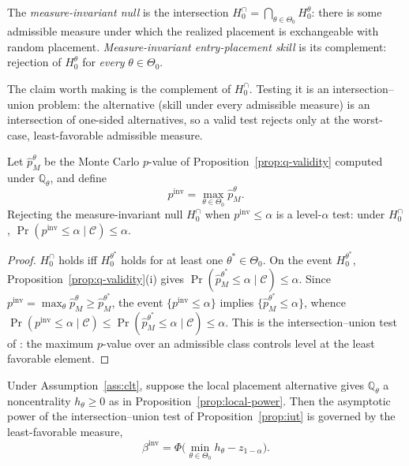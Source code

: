 \begin{definition}
\label{def:invariant}
The \emph{measure-invariant null} is the intersection
$H_0^{\cap}=\bigcap_{\theta\in\Theta_0}H_0^\theta$: there is some admissible
measure under which the realized placement is exchangeable with random placement.
\emph{Measure-invariant entry-placement skill} is its complement: rejection of
$H_0^\theta$ for \emph{every} $\theta\in\Theta_0$.
\end{definition}

The claim worth making is the complement of $H_0^{\cap}$. Testing it is an
intersection--union problem: the alternative (skill under every admissible
measure) is an intersection of one-sided alternatives, so a valid test rejects
only at the worst-case, least-favorable admissible measure.

\begin{proposition}
\label{prop:iut}
Let $\hat p_M^\theta$ be the Monte Carlo $p$-value of
Proposition~\ref{prop:q-validity} computed under $\mathbb{Q}_\theta$, and define
\[
p^{\mathrm{inv}}=\max_{\theta\in\Theta_0}\hat p_M^\theta .
\]
Rejecting the measure-invariant null $H_0^{\cap}$ when
$p^{\mathrm{inv}}\le\alpha$ is a level-$\alpha$ test: under $H_0^{\cap}$,
$\Pr(p^{\mathrm{inv}}\le\alpha\mid\mathcal C)\le\alpha$.
\end{proposition}

\begin{proof}
$H_0^{\cap}$ holds iff $H_0^{\theta^\ast}$ holds for at least one
$\theta^\ast\in\Theta_0$. On the event $H_0^{\theta^\ast}$,
Proposition~\ref{prop:q-validity}(i) gives
$\Pr(\hat p_M^{\theta^\ast}\le\alpha\mid\mathcal C)\le\alpha$. Since
$p^{\mathrm{inv}}=\max_\theta\hat p_M^\theta\ge\hat p_M^{\theta^\ast}$, the event
$\{p^{\mathrm{inv}}\le\alpha\}$ implies $\{\hat p_M^{\theta^\ast}\le\alpha\}$,
whence
$\Pr(p^{\mathrm{inv}}\le\alpha\mid\mathcal C)\le\Pr(\hat
p_M^{\theta^\ast}\le\alpha\mid\mathcal C)\le\alpha$.
This is the intersection--union test of \cite{LehmannRomano2005}: the maximum
$p$-value over an admissible class controls level at the least favorable element.
\end{proof}

\begin{corollary}
\label{cor:iut-power}
Under Assumption~\ref{ass:clt}, suppose the local placement alternative gives
$\mathbb{Q}_\theta$ a noncentrality $h_\theta\ge0$ as in
Proposition~\ref{prop:local-power}. Then the asymptotic power of the
intersection--union test of Proposition~\ref{prop:iut} is governed by the
least-favorable measure,
\[
\beta^{\mathrm{inv}}=\Phi\big(\min_{\theta\in\Theta_0}h_\theta-z_{1-\alpha}\big).
\]
\end{corollary}

